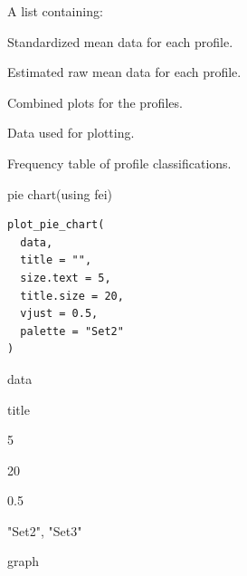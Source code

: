 \documentclass[a4paper]{book}
\begin{document}
%
\begin{Value}
A list containing:
\begin{ldescription}
\item[\code{std}] Standardized mean data for each profile.
\item[\code{est}] Estimated raw mean data for each profile.
\item[\code{graph}] Combined plots for the profiles.
\item[\code{plot\_data}] Data used for plotting.
\item[\code{Class\_freq}] Frequency table of profile classifications.
\end{ldescription}
\end{Value}
%
\begin{Examples}
\end{Examples}
%
\begin{Description}
pie chart(using fei)
\end{Description}
%
\begin{Usage}
\begin{verbatim}
plot_pie_chart(
  data,
  title = "",
  size.text = 5,
  title.size = 20,
  vjust = 0.5,
  palette = "Set2"
)
\end{verbatim}
\end{Usage}
%
\begin{Arguments}
\begin{ldescription}
\item[\code{data}] data

\item[\code{title}] title

\item[\code{size.text}] 5

\item[\code{title.size}] 20

\item[\code{vjust}] 0.5

\item[\code{palette}] "Set2", "Set3"
\end{ldescription}
\end{Arguments}
%
\begin{Value}
graph
\end{Value}
\end{document}
